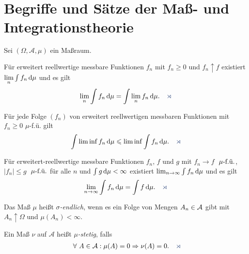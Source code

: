 \appendix

\chapter{Begriffe und Sätze der Maß- und Integrationstheorie}

Sei $(\Omega, {\mathcal A}, \mu)$ ein Maßraum.

\begin{propn}
Für erweitert reellwertige
messbare Funktionen $f_{n}$ mit $f_{n} \geq0$ und $f_{n}
\uparrow f$ existiert $\lim\limits_{n} \int f_{n}\dmu$ und es gilt
\begin{align*}
\lim\limits_{n} \int f_{n}\dmu = \int \lim\limits_{n}
f_{n}\dmu.\fishhere
\end{align*}
\end{propn}

\begin{propn}
Für jede Folge $(f_n)$ von erweitert reellwertigen
messbaren Funktionen mit $f_n \ge 0$ $\mu$-f.ü. gilt
\begin{align*}
\int \liminf f_n \dmu \le \liminf \int f_n \dmu.\fishhere 
\end{align*}
\end{propn}

\begin{propn}
Für erweitert-reellwertige messbare Funktionen $f_n$, $f$ und
$g$ mit $f_n \to f$ $\mufu$, $|f_n| \le g$ $\mufu$ für
alle $n$ und $\int g \dmu < \infty$ existiert $\lim_{n\to\infty} \int f_n\dmu$
und es gilt
\begin{align*}
\lim_{n\to\infty} \int f_n \dmu = \int f\dmu.\fishhere
\end{align*}
\end{propn}

\begin{defnn}
\begin{defnenum}
\item
Das Maß $\mu$ heißt \emph{$\sigma$-endlich}, wenn es ein
Folge von Mengen $A_n\in\AA$ gibt mit $A_n \uparrow
\Omega$ und $\mu(A_n) < \infty$.
\item Ein Maß $\nu$ auf ${\mathcal A}$ heißt \emph{$\mu$-stetig}, falls
\begin{align*}
\forall A \in \AA :  \mu(A)=0 \Rightarrow \nu(A)=0.\fishhere
\end{align*} 
\end{defnenum}
\end{defnn}

